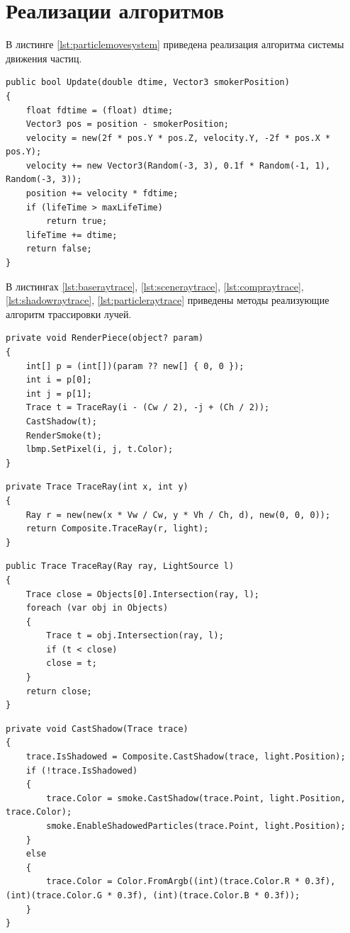 \section{Реализации алгоритмов}

В листинге \ref{lst:particlemovesystem} приведена реализация алгоритма системы движения частиц.
\captionsetup{justification=raggedright, singlelinecheck=false}
\begin{lstlisting}[label=lst:particlemovesystem,caption=Метод с реализацией ситемы движения частиц.]
public bool Update(double dtime, Vector3 smokerPosition)
{
	float fdtime = (float) dtime;
	Vector3 pos = position - smokerPosition;
	velocity = new(2f * pos.Y * pos.Z, velocity.Y, -2f * pos.X * pos.Y);
	velocity += new Vector3(Random(-3, 3), 0.1f * Random(-1, 1), Random(-3, 3));
	position += velocity * fdtime;
	if (lifeTime > maxLifeTime)
		return true;
	lifeTime += dtime;
	return false;
}
\end{lstlisting}
В листингах \ref{lst:baseraytrace}, \ref{lst:sceneraytrace}, \ref{lst:compraytrace}, 
\ref{lst:shadowraytrace}, \ref{lst:particleraytrace} приведены методы реализующие алгоритм трассировки лучей.
\newpage
\begin{lstlisting}[label=lst:baseraytrace,caption=Основной метод.]
private void RenderPiece(object? param)
{
	int[] p = (int[])(param ?? new[] { 0, 0 });
	int i = p[0];
	int j = p[1];
	Trace t = TraceRay(i - (Cw / 2), -j + (Ch / 2));
	CastShadow(t);
	RenderSmoke(t);
	lbmp.SetPixel(i, j, t.Color);
}
\end{lstlisting}

\begin{lstlisting}[label=lst:sceneraytrace,caption=Метод создания луча взгляда.]
private Trace TraceRay(int x, int y)
{
	Ray r = new(new(x * Vw / Cw, y * Vh / Ch, d), new(0, 0, 0));
	return Composite.TraceRay(r, light);
}
\end{lstlisting}

\begin{lstlisting}[label=lst:compraytrace,caption=Метод нахождения пересечения луча взгляда с объектом сцены Composite.TraceRay.]
public Trace TraceRay(Ray ray, LightSource l)
{
	Trace close = Objects[0].Intersection(ray, l);
	foreach (var obj in Objects)
	{
		Trace t = obj.Intersection(ray, l);
		if (t < close)
		close = t;
	}
	return close;
}
\end{lstlisting}

\begin{lstlisting}[label=lst:shadowraytrace,caption=Метод затенения пересечения луча взгляда с объектом сцены.]
private void CastShadow(Trace trace)
{
	trace.IsShadowed = Composite.CastShadow(trace, light.Position);
	if (!trace.IsShadowed)
	{
		trace.Color = smoke.CastShadow(trace.Point, light.Position, trace.Color);
		smoke.EnableShadowedParticles(trace.Point, light.Position);
	}
	else
	{
		trace.Color = Color.FromArgb((int)(trace.Color.R * 0.3f), (int)(trace.Color.G * 0.3f), (int)(trace.Color.B * 0.3f));
	}
}
\end{lstlisting}


